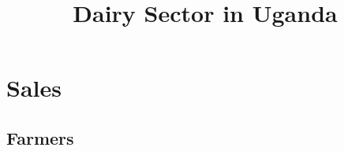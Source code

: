 \documentclass[11pt,letter,draft]{article}
\begin{document}
 
\title{Dairy Sector in Uganda}


\maketitle










\section{Sales}
\subsection{Farmers}
\end{document}
